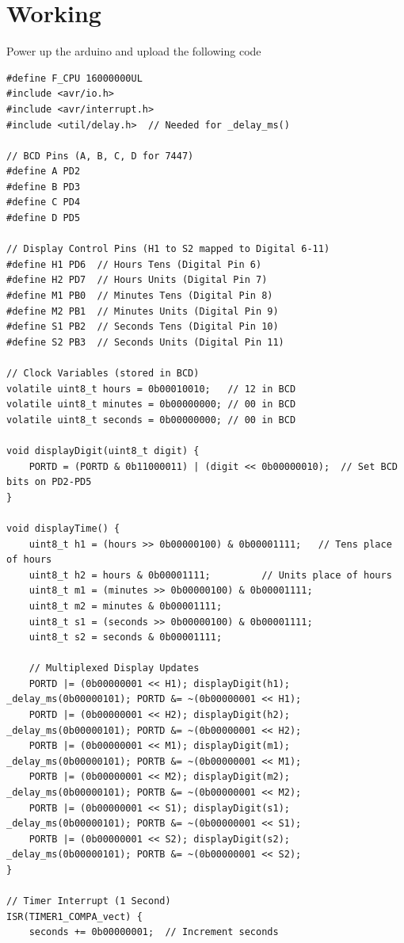 \documentclass[journal]{IEEEtran}
\begin{document}
\section{Working}
Power up the arduino and upload the following code 
\begin{lstlisting}[style=customC]
#define F_CPU 16000000UL 
#include <avr/io.h>
#include <avr/interrupt.h>
#include <util/delay.h>  // Needed for _delay_ms()

// BCD Pins (A, B, C, D for 7447)
#define A PD2  
#define B PD3  
#define C PD4  
#define D PD5  

// Display Control Pins (H1 to S2 mapped to Digital 6-11)
#define H1 PD6  // Hours Tens (Digital Pin 6)
#define H2 PD7  // Hours Units (Digital Pin 7)
#define M1 PB0  // Minutes Tens (Digital Pin 8)
#define M2 PB1  // Minutes Units (Digital Pin 9)
#define S1 PB2  // Seconds Tens (Digital Pin 10)
#define S2 PB3  // Seconds Units (Digital Pin 11)

// Clock Variables (stored in BCD)
volatile uint8_t hours = 0b00010010;   // 12 in BCD
volatile uint8_t minutes = 0b00000000; // 00 in BCD
volatile uint8_t seconds = 0b00000000; // 00 in BCD

void displayDigit(uint8_t digit) {
    PORTD = (PORTD & 0b11000011) | (digit << 0b00000010);  // Set BCD bits on PD2-PD5
}

void displayTime() {
    uint8_t h1 = (hours >> 0b00000100) & 0b00001111;   // Tens place of hours
    uint8_t h2 = hours & 0b00001111;         // Units place of hours
    uint8_t m1 = (minutes >> 0b00000100) & 0b00001111;
    uint8_t m2 = minutes & 0b00001111;
    uint8_t s1 = (seconds >> 0b00000100) & 0b00001111;
    uint8_t s2 = seconds & 0b00001111;

    // Multiplexed Display Updates
    PORTD |= (0b00000001 << H1); displayDigit(h1); _delay_ms(0b00000101); PORTD &= ~(0b00000001 << H1);
    PORTD |= (0b00000001 << H2); displayDigit(h2); _delay_ms(0b00000101); PORTD &= ~(0b00000001 << H2);
    PORTB |= (0b00000001 << M1); displayDigit(m1); _delay_ms(0b00000101); PORTB &= ~(0b00000001 << M1);
    PORTB |= (0b00000001 << M2); displayDigit(m2); _delay_ms(0b00000101); PORTB &= ~(0b00000001 << M2);
    PORTB |= (0b00000001 << S1); displayDigit(s1); _delay_ms(0b00000101); PORTB &= ~(0b00000001 << S1);
    PORTB |= (0b00000001 << S2); displayDigit(s2); _delay_ms(0b00000101); PORTB &= ~(0b00000001 << S2);
}

// Timer Interrupt (1 Second)
ISR(TIMER1_COMPA_vect) {
    seconds += 0b00000001;  // Increment seconds


\end{lstlisting}
\end{document}
